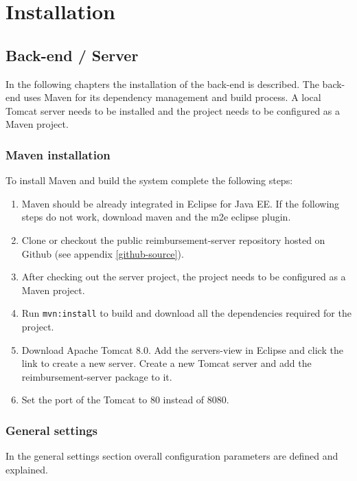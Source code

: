 \appendix

\chapter{Installation}
\label{chap:installation}

\section{Back-end / Server}
\label{sec:backend-server}

In the following chapters the installation of the back-end is described. The back-end uses Maven for its dependency management and build process. A local Tomcat server needs to be installed and the project needs to be configured as a Maven project.

\subsection{Maven installation}
To install Maven and build the system complete the following steps:

\begin{enumerate}
    \item Maven should be already integrated in Eclipse for Java EE. If the following steps do not work, download maven and the m2e eclipse plugin.
    \item Clone or checkout the public reimbursement-server repository hosted on Github (see appendix \ref{github-source}).
    \item After checking out the server project, the project needs to be configured as a Maven project.
    \item Run \texttt{mvn:install} to build and download all the dependencies required for the project.
    \item Download Apache Tomcat 8.0. Add the servers-view in Eclipse and click the link to create a new server. Create a new Tomcat server and add the reimbursement-server package to it.
    \item Set the port of the Tomcat to 80 instead of 8080.
\end{enumerate}

\subsection{General settings}

In the general settings section overall configuration parameters are defined and explained.

